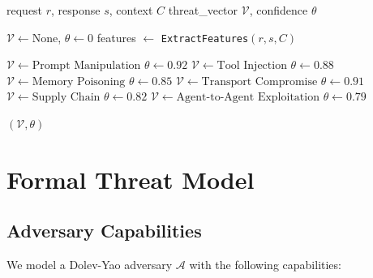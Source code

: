 \documentclass[12pt,twocolumn,journal]{IEEEtran}
\begin{document}
\begin{algorithm}
\caption{MCP-TaxSec Attack Classifier}
\label{alg:classifier}
\begin{algorithmic}
\REQUIRE request $r$, response $s$, context $C$
\ENSURE threat\_vector $\mathcal{V}$, confidence $\theta$

\STATE $\mathcal{V} \leftarrow \text{None}$, $\theta \leftarrow 0$
\STATE features $\leftarrow$ \texttt{ExtractFeatures}$(r, s, C)$

    \STATE $\mathcal{V} \leftarrow \text{Prompt Manipulation}$
    \STATE $\theta \leftarrow 0.92$
    \STATE $\mathcal{V} \leftarrow \text{Tool Injection}$
    \STATE $\theta \leftarrow 0.88$
    \STATE $\mathcal{V} \leftarrow \text{Memory Poisoning}$
    \STATE $\theta \leftarrow 0.85$
    \STATE $\mathcal{V} \leftarrow \text{Transport Compromise}$
    \STATE $\theta \leftarrow 0.91$
    \STATE $\mathcal{V} \leftarrow \text{Supply Chain}$
    \STATE $\theta \leftarrow 0.82$
    \STATE $\mathcal{V} \leftarrow \text{Agent-to-Agent Exploitation}$
    \STATE $\theta \leftarrow 0.79$
\ENDIF

\RETURN $(\mathcal{V}, \theta)$
\end{algorithmic}
\end{algorithm}

\section{Formal Threat Model}
\label{sec:threat_model}

\subsection{Adversary Capabilities}

We model a Dolev-Yao adversary $\mathcal{A}$ with the following capabilities:
\end{document}
